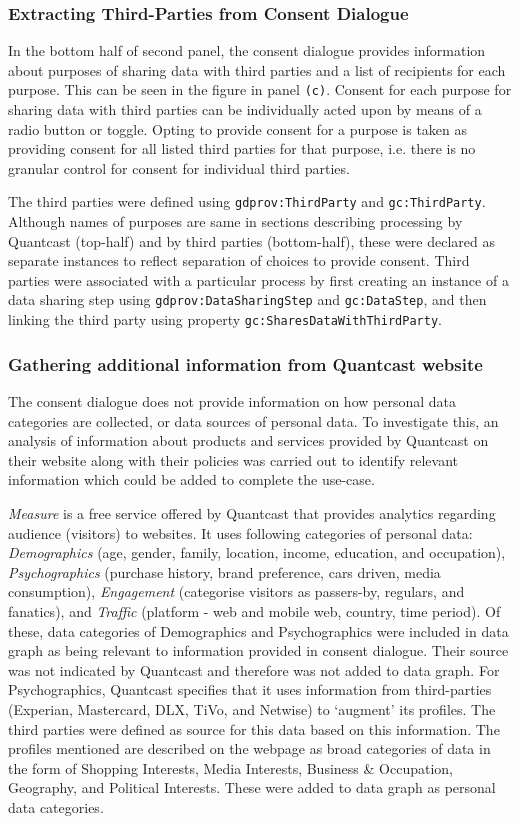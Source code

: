 \subsubsection{Extracting Third-Parties from Consent Dialogue}
In the bottom half of second panel, the consent dialogue provides information about purposes of sharing data with third parties and a list of recipients for each purpose. This can be seen in the figure in panel \texttt{(c)}.
Consent for each purpose for sharing data with third parties can be individually acted upon by means of a radio button or toggle. Opting to provide consent for a purpose is taken as providing consent for all listed third parties for that purpose, i.e. there is no granular control for consent for individual third parties. 

The third parties were defined using \texttt{gdprov:ThirdParty} and \texttt{gc:ThirdParty}.
Although names of purposes are same in sections describing processing by Quantcast (top-half) and by third parties (bottom-half), these were declared as separate instances to reflect separation of choices to provide consent.
Third parties were associated with a particular process by first creating an instance of a data sharing step using \texttt{gdprov:DataSharingStep} and \texttt{gc:DataStep}, and then linking the third party using property \texttt{gc:SharesDataWithThirdParty}.

\subsubsection{Gathering additional information from Quantcast website}
The consent dialogue does not provide information on how personal data categories are collected, or data sources of personal data. To investigate this, an analysis of information about products and services provided by Quantcast on their website along with their policies was carried out to identify relevant information which could be added to complete the use-case.

\textit{Measure} is a free service offered by Quantcast that provides analytics regarding audience (visitors) to websites. It uses following categories of personal data: \textit{Demographics} (age, gender, family, location, income, education, and occupation), \textit{Psychographics} (purchase history, brand preference, cars driven, media consumption), \textit{Engagement} (categorise visitors as passers-by, regulars, and fanatics), and \textit{Traffic} (platform - web and mobile web, country, time period). Of these, data categories of Demographics and Psychographics were included in data graph as being relevant to information provided in consent dialogue. Their source was not indicated by Quantcast and therefore was not added to  data graph.
For Psychographics, Quantcast specifies that it uses information from third-parties (Experian, Mastercard, DLX, TiVo, and Netwise) to `augment' its profiles. The third parties were defined as source for this data based on this information.
The profiles mentioned are described on the webpage as broad categories of data in the form of Shopping Interests, Media Interests, Business \& Occupation, Geography, and Political Interests. These were added to data graph as personal data categories.

